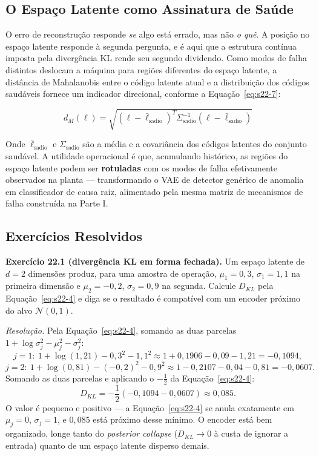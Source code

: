 \documentclass[12pt,a4paper]{article}
\numberwithin{equation}{section}
\numberwithin{table}{section}
\numberwithin{figure}{section}
\begin{document}
{	\subsection{O Espaço Latente como Assinatura de Saúde}

	O erro de reconstrução responde \textit{se} algo está errado, mas não \textit{o quê}. A posição no espaço latente responde à segunda pergunta, e é aqui que a estrutura contínua imposta pela divergência KL rende seu segundo dividendo. Como modos de falha distintos deslocam a máquina para regiões diferentes do espaço latente, a distância de Mahalanobis entre o código latente atual e a distribuição dos códigos saudáveis fornece um indicador direcional, conforme a Equação~\eqref{eq:s22-7}:

	\begin{equation}\label{eq:s22-7}
	d_M(\ell) = \sqrt{ (\ell - \bar{\ell}_{\text{sadio}})^T \Sigma_{\text{sadio}}^{-1} (\ell - \bar{\ell}_{\text{sadio}}) }
\end{equation}

	Onde $\bar{\ell}_{\text{sadio}}$ e $\Sigma_{\text{sadio}}$ são a média e a covariância dos códigos latentes do conjunto saudável. A utilidade operacional é que, acumulando histórico, as regiões do espaço latente podem ser \textbf{rotuladas} com os modos de falha efetivamente observados na planta — transformando o VAE de detector genérico de anomalia em classificador de causa raiz, alimentado pela mesma matriz de mecanismos de falha construída na Parte I.

	\subsection{Exercícios Resolvidos}

	\textbf{Exercício 22.1 (divergência KL em forma fechada).} Um espaço
	latente de $d=2$ dimensões produz, para uma amostra de operação,
	$\mu_1=0{,}3$, $\sigma_1=1{,}1$ na primeira dimensão e $\mu_2=-0{,}2$,
	$\sigma_2=0{,}9$ na segunda. Calcule $D_{KL}$ pela
	Equação~\eqref{eq:s22-4} e diga se o resultado é compatível com um
	encoder próximo do alvo $\mathcal{N}(0,1)$.

	\emph{Resolução.} Pela Equação~\eqref{eq:s22-4}, somando as duas
	parcelas $1+\log\sigma_j^2-\mu_j^2-\sigma_j^2$:
	$$j=1:\ 1+\log(1{,}21)-0{,}3^2-1{,}1^2 \approx 1+0{,}1906-0{,}09-1{,}21
	= -0{,}1094,$$
	$$j=2:\ 1+\log(0{,}81)-(-0{,}2)^2-0{,}9^2 \approx
	1-0{,}2107-0{,}04-0{,}81 = -0{,}0607.$$
	Somando as duas parcelas e aplicando o $-\frac{1}{2}$ da
	Equação~\eqref{eq:s22-4}:
	$$D_{KL} = -\frac{1}{2}(-0{,}1094-0{,}0607) \approx 0{,}085.$$
	O valor é pequeno e positivo --- a Equação~\eqref{eq:s22-4} se anula
	exatamente em $\mu_j=0$, $\sigma_j=1$, e $0{,}085$ está próximo desse
	mínimo. O encoder está bem organizado, longe tanto do
	\textit{posterior collapse} ($D_{KL}\to 0$ à custa de ignorar a
	entrada) quanto de um espaço latente disperso demais.

}
\end{document}
